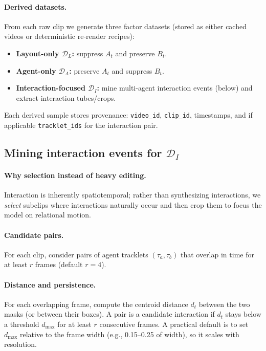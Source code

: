 \paragraph{Derived datasets.} From each raw clip we generate three factor datasets (stored as either cached videos or deterministic re-render recipes):
\begin{itemize}
  \item \textbf{Layout-only $\mathcal{D}_L$:} suppress $A_t$ and preserve $B_t$.
  \item \textbf{Agent-only $\mathcal{D}_A$:} preserve $A_t$ and suppress $B_t$.
  \item \textbf{Interaction-focused $\mathcal{D}_I$:} mine multi-agent interaction events (below) and extract interaction tubes/crops.
\end{itemize}
Each derived sample stores provenance: \texttt{video\_id}, \texttt{clip\_id}, timestamps, and if applicable \texttt{tracklet\_ids} for the interaction pair.

\subsection{Mining interaction events for $\mathcal{D}_I$}\label{sec:surgery_interaction_mining}
\paragraph{Why selection instead of heavy editing.} Interaction is inherently spatiotemporal; rather than synthesizing interactions, we \emph{select} subclips where interactions naturally occur and then crop them to focus the model on relational motion.
\paragraph{Candidate pairs.} For each clip, consider pairs of agent tracklets $(\tau_a,\tau_b)$ that overlap in time for at least $r$ frames (default $r{=}4$).
\paragraph{Distance and persistence.} For each overlapping frame, compute the centroid distance $d_t$ between the two masks (or between their boxes). A pair is a candidate interaction if $d_t$ stays below a threshold $d_{\max}$ for at least $r$ consecutive frames. A practical default is to set $d_{\max}$ relative to the frame width (e.g., 0.15--0.25 of width), so it scales with resolution.
